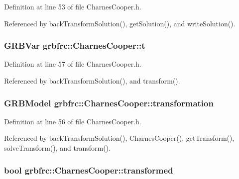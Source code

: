 Definition at line 53 of file Charnes\+Cooper.\+h.



Referenced by back\+Transform\+Solution(), get\+Solution(), and write\+Solution().

\subsubsection[{\texorpdfstring{t}{t}}]{\setlength{\rightskip}{0pt plus 5cm}G\+R\+B\+Var grbfrc\+::\+Charnes\+Cooper\+::t\hspace{0.3cm}{\ttfamily [private]}}\hypertarget{classgrbfrc_1_1CharnesCooper_a8e03048a467411b2147ef10acad3ff4f}{}\label{classgrbfrc_1_1CharnesCooper_a8e03048a467411b2147ef10acad3ff4f}


Definition at line 57 of file Charnes\+Cooper.\+h.



Referenced by back\+Transform\+Solution(), and transform().

\subsubsection[{\texorpdfstring{transformation}{transformation}}]{\setlength{\rightskip}{0pt plus 5cm}G\+R\+B\+Model grbfrc\+::\+Charnes\+Cooper\+::transformation\hspace{0.3cm}{\ttfamily [private]}}\hypertarget{classgrbfrc_1_1CharnesCooper_a9107f891576f27501e5f103dca964359}{}\label{classgrbfrc_1_1CharnesCooper_a9107f891576f27501e5f103dca964359}


Definition at line 56 of file Charnes\+Cooper.\+h.



Referenced by back\+Transform\+Solution(), Charnes\+Cooper(), get\+Transform(), solve\+Transform(), and transform().

\subsubsection[{\texorpdfstring{transformed}{transformed}}]{\setlength{\rightskip}{0pt plus 5cm}bool grbfrc\+::\+Charnes\+Cooper\+::transformed\hspace{0.3cm}{\ttfamily [private]}}\hypertarget{classgrbfrc_1_1CharnesCooper_a9a0d42480205cfd0f380e104ba83f24e}{}\label{classgrbfrc_1_1CharnesCooper_a9a0d42480205cfd0f380e104ba83f24e}


